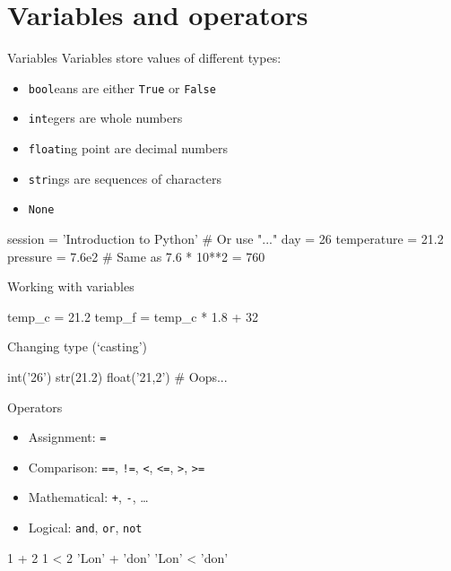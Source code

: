 \section{Variables and operators}

\begin{frame}[fragile]{Variables}
    Variables store values of different \alert{types}:
    \begin{itemize}
        \item \texttt{bool}eans are either \texttt{True}
              or \texttt{False}
        \item \texttt{int}egers are whole numbers
        \item \texttt{float}ing point are decimal numbers
        \item \texttt{str}ings are sequences of characters
        \item \texttt{None}
    \end{itemize}
    \vfill
    \begin{py3}
        session = 'Introduction to Python'  # Or use "..."
        day = 26
        temperature = 21.2
        pressure = 7.6e2  # Same as 7.6 * 10**2 = 760
    \end{py3}
\end{frame}

\begin{frame}[fragile]{Working with variables}
    \begin{py3}
        temp_c = 21.2
        temp_f = temp_c * 1.8 + 32
    \end{py3}
    \vfill\pause
    \begin{block}{Changing type (`casting')}
        \begin{py3}
            int('26')
            str(21.2)
            float('21,2')  # Oops...
        \end{py3}
    \end{block}
\end{frame}

\begin{frame}[fragile]{Operators}
    \begin{itemize}
        \setlength{\itemsep}{0.75em}
        \item Assignment: \texttt{=}
        \item Comparison: \texttt{==}, \texttt{!=},
                          \texttt{<}, \texttt{<=},
                          \texttt{>}, \texttt{>=}
        \item Mathematical: \texttt{+}, \texttt{-},
                            \ldots
        \item Logical: \texttt{and}, \texttt{or},
                       \texttt{not}
    \end{itemize}
    \vfill
    \begin{py3}
        1 + 2
        1 < 2
        'Lon' + 'don'
        'Lon' < 'don'
    \end{py3}
\end{frame}

